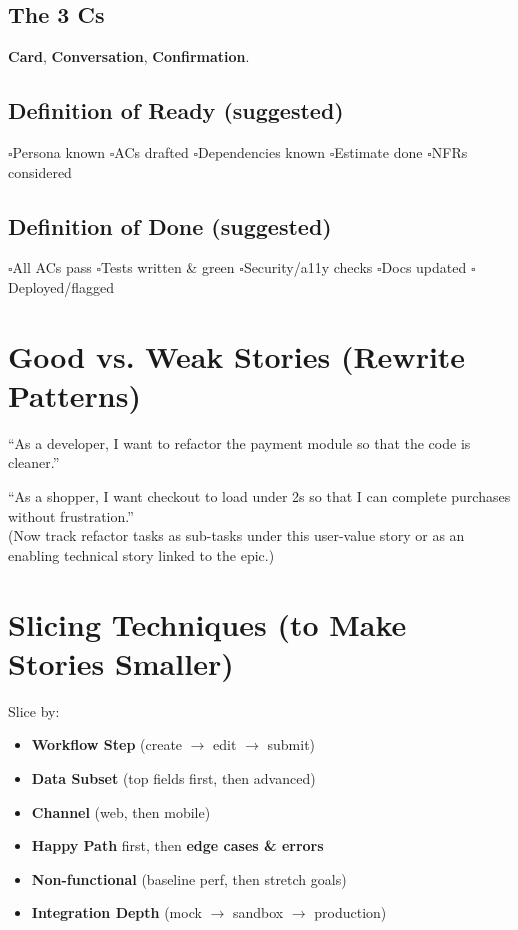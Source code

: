 \documentclass[11pt,a4paper]{article}
\newcommand{\checkbox}{\(\square\)}
\begin{document}
\subsection*{The 3 Cs}
\textbf{Card}, \textbf{Conversation}, \textbf{Confirmation}.

\subsection*{Definition of Ready (suggested)}
\checkbox Persona known \quad
\checkbox ACs drafted \quad
\checkbox Dependencies known \quad
\checkbox Estimate done \quad
\checkbox NFRs considered

\subsection*{Definition of Done (suggested)}
\checkbox All ACs pass \quad
\checkbox Tests written \& green \quad
\checkbox Security/a11y checks \quad
\checkbox Docs updated \quad
\checkbox Deployed/flagged

\clearpage
\section{Good vs. Weak Stories (Rewrite Patterns)}
\begin{tcolorbox}[title=Weak]
``As a developer, I want to refactor the payment module so that the code is cleaner.''
\end{tcolorbox}
\begin{tcolorbox}[title=Rewrite (User Value)]
``As a shopper, I want checkout to load under 2s so that I can complete purchases without frustration.''\\
(Now track refactor tasks as sub-tasks under this user-value story or as an enabling technical story linked to the epic.)
\end{tcolorbox}

\clearpage
\section{Slicing Techniques (to Make Stories Smaller)}
Slice by:
\begin{itemize}
  \item \textbf{Workflow Step} (create \(\rightarrow\) edit \(\rightarrow\) submit)
  \item \textbf{Data Subset} (top fields first, then advanced)
  \item \textbf{Channel} (web, then mobile)
  \item \textbf{Happy Path} first, then \textbf{edge cases \& errors}
  \item \textbf{Non-functional} (baseline perf, then stretch goals)
  \item \textbf{Integration Depth} (mock \(\rightarrow\) sandbox \(\rightarrow\) production)
\end{itemize}
\end{document}

